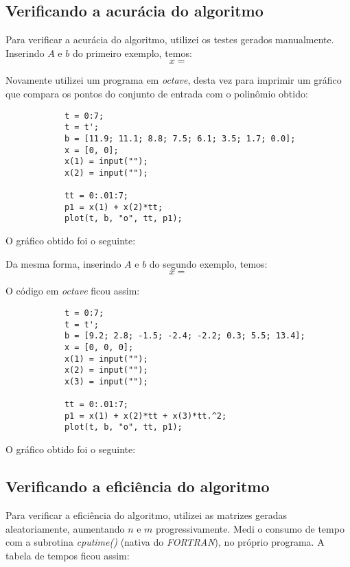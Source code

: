 \documentclass[a4paper,11pt]{article}
\begin{document}
        
    \subsection{Verificando a acurácia do algoritmo}
        Para verificar a acurácia do algoritmo, utilizei os testes gerados manualmente. Inserindo $A$ e $b$ do primeiro exemplo, temos:
        $$
        x =
        $$
        
        Novamente utilizei um programa em \textit{octave}, desta vez para imprimir um gráfico que compara os pontos do conjunto de entrada com o polinômio obtido:
        \begin{lstlisting}
            t = 0:7;
            t = t';
            b = [11.9; 11.1; 8.8; 7.5; 6.1; 3.5; 1.7; 0.0];
            x = [0, 0];
            x(1) = input("");
            x(2) = input("");
            
            tt = 0:.01:7;
            p1 = x(1) + x(2)*tt;
            plot(t, b, "o", tt, p1);
        \end{lstlisting}
        
        O gráfico obtido foi o seguinte:
        
        Da mesma forma, inserindo $A$ e $b$ do segundo exemplo, temos:
        $$
        x =
        $$
        
        O código em \textit{octave} ficou assim:
        \begin{lstlisting}
            t = 0:7;
            t = t';
            b = [9.2; 2.8; -1.5; -2.4; -2.2; 0.3; 5.5; 13.4];
            x = [0, 0, 0];
            x(1) = input("");
            x(2) = input("");
            x(3) = input("");
            
            tt = 0:.01:7;
            p1 = x(1) + x(2)*tt + x(3)*tt.^2;
            plot(t, b, "o", tt, p1);
        \end{lstlisting}
        
        O gráfico obtido foi o seguinte:
        
    \subsection{Verificando a eficiência do algoritmo}
        Para verificar a eficiência do algoritmo, utilizei as matrizes geradas aleatoriamente, aumentando $n$ e $m$ progressivamente. Medi o consumo de tempo com a subrotina \textit{cputime()} (nativa do \textit{FORTRAN}), no próprio programa. A tabela de tempos ficou assim:
\end{document}
